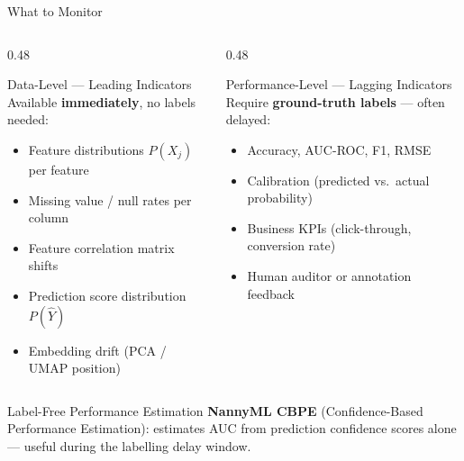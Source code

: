 \documentclass[10pt,aspectratio=169]{beamer}
\begin{document}
\begin{frame}{What to Monitor}
  \begin{columns}[T]
    \begin{column}{0.48\textwidth}
      \begin{block}{Data-Level --- Leading Indicators}
        Available \textbf{immediately}, no labels needed:
        \begin{itemize}
          \item Feature distributions $P(X_j)$ per feature
          \item Missing value / null rates per column
          \item Feature correlation matrix shifts
          \item Prediction score distribution $P(\hat{Y})$
          \item Embedding drift (PCA / UMAP position)
        \end{itemize}
      \end{block}
    \end{column}
    \begin{column}{0.48\textwidth}
      \begin{alertblock}{Performance-Level --- Lagging Indicators}
        Require \textbf{ground-truth labels} --- often delayed:
        \begin{itemize}
          \item Accuracy, AUC-ROC, F1, RMSE
          \item Calibration (predicted vs.\ actual probability)
          \item Business KPIs (click-through, conversion rate)
          \item Human auditor or annotation feedback
        \end{itemize}
      \end{alertblock}
    \end{column}
  \end{columns}
  \vspace{0.3cm}
  \begin{block}{Label-Free Performance Estimation}
    \textbf{NannyML CBPE} (Confidence-Based Performance Estimation): estimates AUC from prediction confidence scores alone --- useful during the labelling delay window.
  \end{block}
\end{frame}
\end{document}
